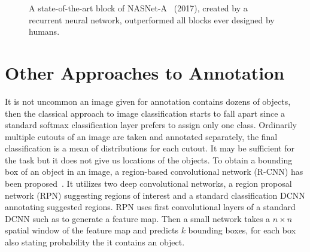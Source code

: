 \begin{figure}
	\centering
	
	
	\caption[A state-of-the-art block of NASNet-A]{A state-of-the-art block of NASNet-A~\cite{zoph2017learning} (2017), created by a recurrent neural network, outperformed all blocks ever designed by humans.}
	\label{fig:nasnet_block}
\end{figure}

\section*{Other Approaches to Annotation}

It is not uncommon an image given for annotation contains dozens of objects, then the classical approach to image classification starts to fall apart since a standard softmax classification layer prefers to assign only one class. Ordinarily multiple cutouts of an image are taken and annotated separately, the final classification is a mean of distributions for each cutout. It may be sufficient for the task but it does not give us locations of the objects. To obtain a bounding box of an object in an image, a region-based convolutional network (R-CNN) has been proposed~\cite{ren2015faster}. It utilizes two deep convolutional networks, a region proposal network (RPN) suggesting regions of interest and a standard classification DCNN annotating suggested regions. RPN uses first convolutional layers of a standard DCNN such as \cite{simonyan2014very} to generate a feature map. Then a small network takes a $n\times n$ spatial window of the feature map and predicts $k$ bounding boxes, for each box also stating probability the it contains an object.